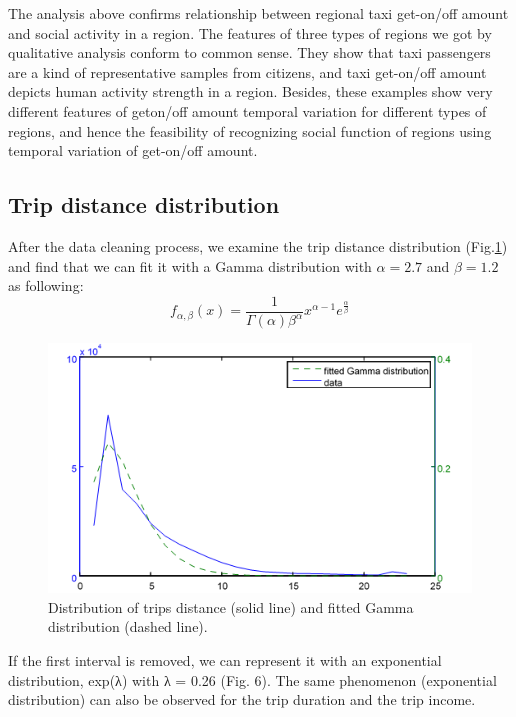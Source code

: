 \documentclass[a4paper, 10pt, conference]{ieeeconf}      %
\begin{document}
The analysis above confirms relationship between regional taxi get-on/off amount and social activity in a region. The features of three types of regions we got by qualitative analysis conform to common sense. They show that taxi passengers are a kind of representative samples from citizens, and taxi get-on/off amount depicts human activity strength in a region. Besides, these examples show very different features of geton/off amount temporal variation for different types of regions, and hence the feasibility of recognizing social function of regions using temporal variation of get-on/off amount.

\subsection{Trip distance distribution}After the data cleaning process, we examine the trip distance distribution (Fig.\ref{fig:my_png_5}) and find that we can fit it with a Gamma distribution with $ \alpha =2.7 $ and $\beta =1.2 $ as following:
 \begin{equation}
 	f_{\alpha,\beta}(x)=\frac{1}{\Gamma(\alpha)\beta^{\alpha}}x^{\alpha-1}e^{\frac{\alpha}{\beta}}
    \label{eq:quadratic}
\end{equation}

\begin{figure}[htbp]
    \centering
    \includegraphics{fig/png5.png}
    \caption{Distribution of trips distance (solid line) and fitted Gamma distribution (dashed line). }
    \label{fig:my_png_5}
\end{figure}

If the first interval is removed, we can represent it with an exponential distribution, exp(λ) with λ = 0.26 (Fig. 6). The same phenomenon (exponential distribution) can also be observed for the trip duration and the trip income. 
\end{document}
